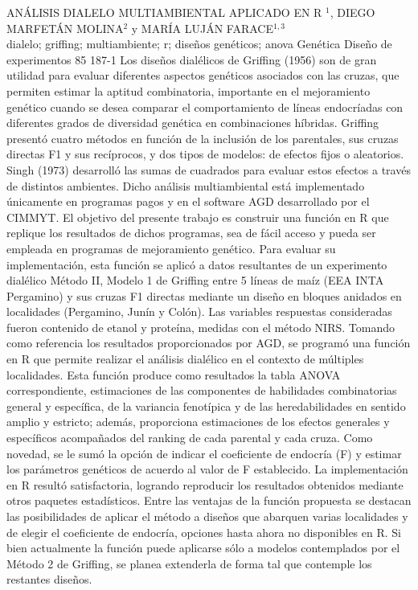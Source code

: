 \A
{ANÁLISIS DIALELO MULTIAMBIENTAL APLICADO EN R}
{$^1$, DIEGO MARFETÁN MOLINA$^2$ y MARÍA LUJÁN FARACE$^{1,3}$}
{
\\}
{dialelo; griffing; multiambiente; r; diseños genéticos; anova} 
 {Genética} 
 {Diseño de experimentos} 
 {85} 
 {187-1}
{Los diseños dialélicos de Griffing (1956) son de gran utilidad para evaluar diferentes aspectos genéticos asociados con las cruzas, que permiten estimar la aptitud combinatoria, importante en el mejoramiento genético cuando se desea comparar el comportamiento de líneas endocríadas con diferentes grados de diversidad genética en combinaciones híbridas. Griffing presentó cuatro métodos en función de la inclusión de los parentales, sus cruzas directas F1 y sus recíprocos, y dos tipos de modelos: de efectos fijos o aleatorios. Singh (1973) desarrolló las sumas de cuadrados para evaluar estos efectos a través de distintos ambientes. Dicho análisis multiambiental está implementado únicamente en programas pagos y en el software AGD desarrollado por el CIMMYT. El objetivo del presente trabajo es construir una función en R que replique los resultados de dichos programas, sea de fácil acceso y pueda ser empleada en programas de mejoramiento genético. Para evaluar su implementación, esta función se aplicó a datos resultantes de un experimento dialélico Método II, Modelo 1 de Griffing entre 5 líneas de maíz (EEA INTA Pergamino) y sus cruzas F1 directas mediante un diseño en bloques anidados en localidades (Pergamino, Junín y Colón). Las variables respuestas consideradas fueron contenido de etanol y proteína, medidas con el método NIRS. Tomando como referencia los resultados proporcionados por AGD, se programó una función en R que permite realizar el análisis dialélico en el contexto de múltiples localidades. Esta función produce como resultados la tabla ANOVA correspondiente, estimaciones de las componentes de habilidades combinatorias general y específica, de la variancia fenotípica y de las heredabilidades en sentido amplio y estricto; además, proporciona estimaciones de los efectos generales y específicos acompañados del ranking de cada parental y cada cruza. Como novedad, se le sumó la opción de indicar el coeficiente de endocría (F) y estimar los parámetros genéticos de acuerdo al valor de F establecido. La implementación en R resultó satisfactoria, logrando reproducir los resultados obtenidos mediante otros paquetes estadísticos. Entre las ventajas de la función propuesta se destacan las posibilidades de aplicar el método a diseños que abarquen varias localidades y de elegir el coeficiente de endocría, opciones hasta ahora no disponibles en R. Si bien actualmente la función puede aplicarse sólo a modelos contemplados por el Método 2 de Griffing, se planea extenderla de forma tal que contemple los restantes diseños.}
